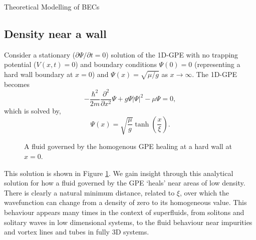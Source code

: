 \begin{chapter}{\label{cha:theoretical_model}Theoretical Modelling of BECs}
	\subsection{\label{section:wall} Density near a wall}
	Consider a stationary ($\partial \Psi / \partial t = 0$) solution of the 1D-GPE with no trapping potential ($V(x,t)=0$) and boundary conditions $\Psi(0)=0$ (representing a hard wall boundary at $x=0$) and $\Psi(x)=\sqrt{\mu/g}$ as $x\rightarrow\infty$. The 1D-GPE becomes
	\begin{equation}
		-\frac{\hbar^2 }{2m}\frac{\partial^2}{\partial x^2}\Psi + g\Psi|\Psi|^2 - \mu\Psi = 0,
	\end{equation}
	which is solved by,
	\begin{equation}
		\Psi(x) = \sqrt{\frac{\mu}{g}}\tanh \left( \frac{x}{\xi} \right).
	\end{equation}
	\begin{figure}[!ht]
	\centering
  \caption{A fluid governed by the homogenous GPE healing at a hard wall at $x=0$.}\label{fig_wallsoln}
 \end{figure}
	This solution is shown in Figure \ref{fig_wallsoln}. We gain insight through this analytical solution for how a fluid governed by the GPE `heals' near areas of low density. There is clearly a natural minimum distance, related to $\xi$, over which the wavefunction can change from a density of zero to its homogeneous value. This behaviour appears many times in the context of superfluids, from solitons and solitary waves in low dimensional systems, to the fluid behaviour near impurities and vortex lines and tubes in fully 3D systems. 


\end{chapter}
